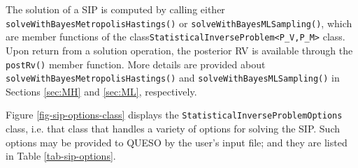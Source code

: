 The solution of a SIP is computed by calling either \verb+solveWithBayesMetropolisHastings()+ or \verb+solveWithBayesMLSampling()+, which are member functions of the class\linebreak\verb+StatisticalInverseProblem<P_V,P_M>+ class.
Upon return from a solution operation, the posterior RV is available through the \verb+postRv()+ member function.
More details are provided about \verb+solveWithBayesMetropolisHastings()+ and \verb+solveWithBayesMLSampling()+ in Sections \ref{sec:MH} and \ref{sec:ML}, respectively.

Figure \ref{fig-sip-options-class} displays the  \verb+StatisticalInverseProblemOptions+ class, i.e. that class that handles a variety of options for solving the SIP. Such options may be provided to QUESO by the user's input file; and they are listed in Table \ref{tab-sip-options}.


